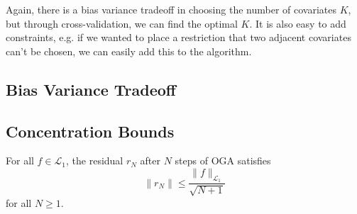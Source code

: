   Again, there is a bias variance tradeoff in choosing the number of covariates $K$, but through cross-validation, we can find the optimal $K$. It is also easy to add constraints, e.g. if we wanted to place a restriction that two adjacent covariates can't be chosen, we can easily add this to the algorithm. 

\subsection{Bias Variance Tradeoff}

\subsection{Concentration Bounds}

  \begin{theorem}
    \label{thm:devore-and-temlyakov-1996}
    For all $f \in \mathcal{L}_1$, the residual $r_N$ after $N$ steps of OGA satisfies
    \begin{equation}
      \|r_N\| \leq \frac{\|f\|_{\mathcal{L}_1}}{\sqrt{N + 1}} \tag{4}
    \end{equation}
    for all $N \geq 1$.
  \end{theorem}
